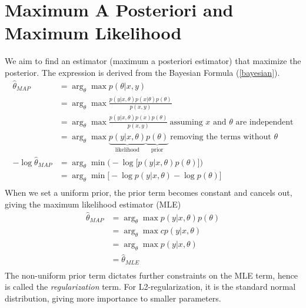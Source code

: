 \documentclass{book}
\numberwithin{equation}{subsection}
\begin{document}
\section{Maximum A Posteriori and Maximum Likelihood}
We aim to find an estimator (maximum a posteriori estimator) that maximize the posterior. The expression is derived from the Bayesian Formula (\ref{bayesian}).
\begin{align}
    \hat{\theta}_{MAP} &= \arg_\theta\max p(\theta | x,y)\\
    &= \arg_\theta\max\frac{p(y|x,\theta)p(x|\theta)p(\theta)}{p(x,y)}\\
    &= \arg_\theta\max\frac{p(y|x,\theta)p(x)p(\theta)}{p(x,y)}\ \text{assuming $x$ and $\theta$ are independent}\\
    &= \arg_\theta\max \underbrace{p(y|x,\theta)}_{\text{likelihood}}\underbrace{p(\theta)}_{\text{prior}}\ \text{removing the terms without $\theta$}\\
    -\log\hat{\theta}_{MAP} &= \arg_\theta\min \Big(-\log \big[p(y|x,\theta)p(\theta)\big]\Big)\\
    &= \arg_\theta\min \big[-\log p(y|x,\theta)-\log p(\theta)\big]\\
\end{align}
When we set a uniform prior, the prior term becomes constant and cancels out, giving the maximum likelihood estimator (MLE)
\begin{align}
    \hat{\theta}_{MAP} &= \arg_\theta\max p(y|x,\theta)p(\theta)\\
    &= \arg_\theta\max c p(y|x,\theta)\\
    &= \arg_\theta\max p(y|x,\theta)\\
    &= \hat{\theta}_{MLE}\\
\end{align}
The non-uniform prior term dictates further constraints on the MLE term, hence is called the \textit{regularization} term. For L2-regularization, it is the standard normal distribution, giving more importance to smaller parameters.
\end{document}
